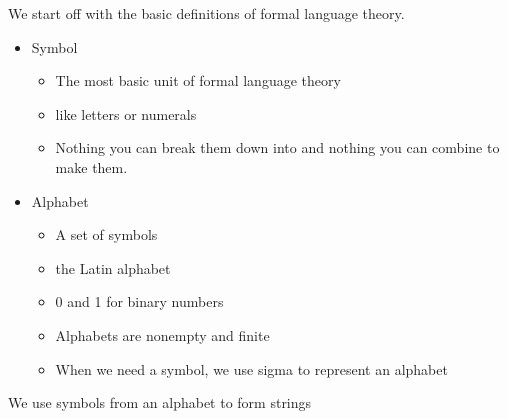 \documentclass[12pt, twoside, letterpaper]{article}
\begin{document}
We start off with the basic definitions of formal language theory.
\begin{itemize}
	\item Symbol
	\begin{itemize}
		\item The most basic unit of formal language theory
		\item like letters or numerals
		\item Nothing you can break them down into and nothing you can combine to make them.
	\end{itemize}

	\item Alphabet
	\begin{itemize}
		\item A set of symbols
		\item the Latin alphabet
		\item 0 and 1 for binary numbers
		\item Alphabets are nonempty and finite
		\item When we need a symbol, we use sigma to represent an alphabet
	\end{itemize}
\end{itemize}

We use symbols from an alphabet to form strings
\end{document}
